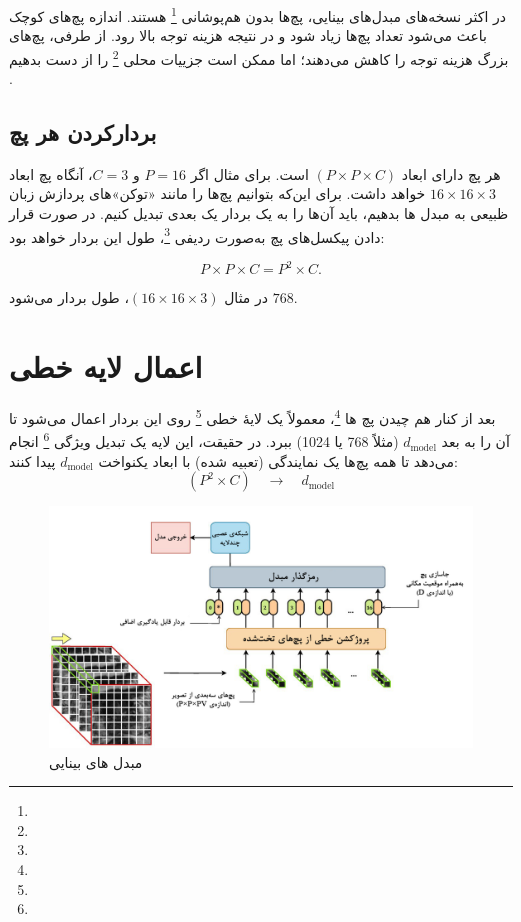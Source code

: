 در اکثر نسخه‌های مبدل‌های بینایی، پچ‌ها بدون هم‌پوشانی \footnote{} هستند. اندازه پچ‌های کوچک باعث می‌شود تعداد پچ‌ها زیاد شود و در نتیجه هزینه توجه بالا رود. از طرفی، پچ‌های بزرگ هزینه توجه را کاهش می‌دهند؛ اما ممکن است جزییات محلی \footnote{} را از دست بدهیم \cite{dosovitskiy2020image}.


\subsection{بردارکردن هر پچ}
هر پچ دارای ابعاد \((P \times P \times C)\) است. برای مثال اگر \(P=16\) و \(C=3\)، آنگاه پچ ابعاد \(16 \times 16 \times 3\) خواهد داشت.  
برای این‌که بتوانیم پچ‌ها را مانند «توکن»‌های پردازش زبان ظبیعی به مبدل ها بدهیم، باید آن‌ها را به یک بردار یک ‌بعدی تبدیل کنیم. در صورت قرار دادن پیکسل‌های پچ به‌صورت ردیفی \footnote{}، طول این بردار خواهد بود:

\begin{equation}
	P \times P \times C = P^2 \times C.
	\label{eq:patch_volume}
\end{equation}

در مثال \((16 \times 16 \times 3)\)، طول بردار می‌شود \(768\).


\section{اعمال لایه خطی}
بعد از کنار هم چیدن پچ ها \footnote{}، معمولاً یک لایهٔ خطی \footnote{} روی این بردار اعمال می‌شود تا آن را به بعد \(d_{\text{model}}\) (مثلاً 768 یا 1024) ببرد. در حقیقت، این لایه یک تبدیل ویژگی \footnote{} انجام می‌دهد تا همه پچ‌ها یک نمایندگی (تعبیه شده) با ابعاد یکنواخت \(d_{\text{model}}\) پیدا کنند:
\[
(P^2 \times C) \quad \rightarrow \quad d_{\text{model}}
\]

\begin{figure}[h]
	\centering
	\begin{minipage}[b]{0.9\textwidth}
		\centering
		\includegraphics[width=\textwidth]{transformer_images/persian images/b07.png}
		\caption{مبدل های بینایی}
		\label{fig:Embedding Vision Transformer}
	\end{minipage}
	\hfill
\end{figure}

